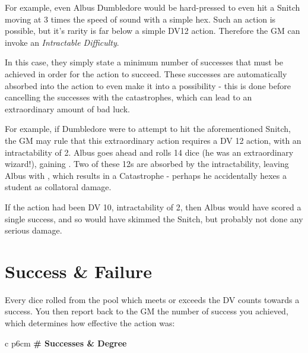 For example, even Albus Dumbledore would be hard-pressed to even hit a Snitch moving at 3 times the speed of sound with a simple hex. Such an action is possible, but it's rarity is far below a simple DV12 action. Therefore the GM can invoke an {\it Intractable Difficulty}. 

In this case, they simply state a minimum number of successes that must be achieved in order for the action to succeed. These successes are automatically absorbed into the action to even make it into a possibility - this is done before cancelling the successes with the catastrophes, which can lead to an extraordinary amount of bad luck. 

For example, if Dumbledore were to attempt to hit the aforementioned Snitch, the GM may rule that this extraordinary action requires a DV 12 action, with an intractability of 2. Albus goes ahead and rolls 14 dice (he was an extraordinary wizard!), gaining . Two of these 12s are absorbed by the intractability, leaving Albus with , which results in a Catastrophe - perhaps he accidentally hexes a student as collatoral damage. 

If the action had been DV 10, intractability of 2, then Albus would have scored a single success, and so would have skimmed the Snitch, but probably not done any serious damage. 

\section{Success \& Failure}

Every dice rolled from the pool which meets or exceeds the DV counts towards a success. You then report back to the GM the number of success you achieved, which determines how effective the action was:


\begin{center}
	\begin{rndtable}{c p{6cm}}
		\bf \# Successes & \bf Degree \\
	\end{rndtable}
\end{center}

